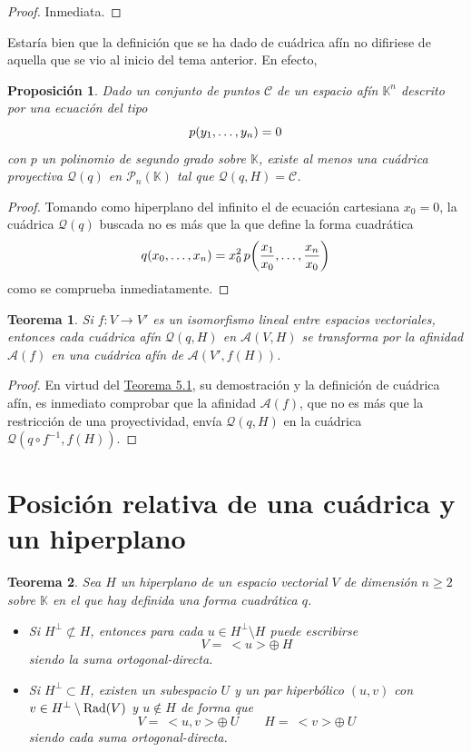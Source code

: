 \documentclass[12pt]{report}
\newtheorem{proposition}{Proposición}[chapter]
\newtheorem{theorem}{Teorema}[chapter]
\theoremstyle{definition}
\theoremstyle{definition}
\theoremstyle{remark}
\begin{document}
\begin{proof}
    Inmediata.
\end{proof}

Estaría bien que la definición que se ha dado de cuádrica afín no difiriese de aquella que se vio al inicio del tema anterior. En efecto,
\begin{proposition}
Dado un conjunto de puntos $\mathcal{C}$ de un espacio afín $\mathbb{K}^n$ descrito por una ecuación del tipo
\[p(y_1,\mathellipsis,y_n) = 0\]
con $p$ un polinomio de segundo grado sobre $\mathbb{K}$, existe al menos una cuádrica proyectiva $\mathcal{Q}(q)$ en $\mathcal{P}_n(\mathbb{K})$ tal que $\mathcal{Q}(q,H) = \mathcal{C}$.
\end{proposition}

\begin{proof}
Tomando como hiperplano del infinito el de ecuación cartesiana $x_0 = 0$, la cuádrica $\mathcal{Q}(q)$ buscada no es más que la que define la forma cuadrática
\[q(x_0,\mathellipsis,x_n) = x_0^2\, p\biggl(\frac{x_1}{x_0},\mathellipsis,\frac{x_n}{x_0} \biggr)\]
como se comprueba inmediatamente.
\end{proof}

\begin{theorem}
    Si $f \colon V \to V'$ es un isomorfismo lineal entre espacios vectoriales, entonces cada cuádrica afín $\mathcal{Q}(q,H)$ en $\mathcal{A}(V,H)$ se transforma por la afinidad $\mathcal{A}(f)$ en una cuádrica afín de $\mathcal{A}(V',f(H))$.
\end{theorem}

\begin{proof}
En virtud del \hyperref[teo5.1.]{\color{blue}Teorema 5.1}, su demostración y la definición de cuádrica afín, es inmediato comprobar que la afinidad $\mathcal{A}(f)$, que no es más que la restricción de una proyectividad, envía $\mathcal{Q}(q,H)$ en la cuádrica $\mathcal{Q}(q \circ f^{-1}, f(H))$.
\end{proof}

\section{Posición relativa de una cuádrica y un hiperplano}

\begin{theorem}
\label{teo6.2.}
Sea $H$ un hiperplano de un espacio vectorial $V$ de dimensión $n \geq 2$ sobre $\mathbb{K}$ en el que hay definida una forma cuadrática $q$.

\begin{itemize}
    \item[(i)] Si $H^\perp \not\subset H$, entonces para cada $u \in H^\perp \setminus H$ puede escribirse
    \[V = \ <u> \oplus \ H\]
    siendo la suma ortogonal-directa.
    \item[(ii)] Si $H^\perp \subset H$, existen un subespacio $U$ y un par hiperbólico $(u,v)$ con $v \in H^\perp \setminus \textup{Rad}(V)$ y $u \notin H$ de forma que
    \[V = \ <u,v> \oplus \ U \qquad H = \ <v> \oplus \ U\]
    siendo cada suma ortogonal-directa.
\end{itemize}

\end{theorem}
\end{document}
